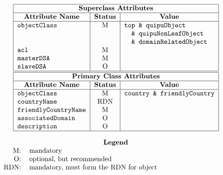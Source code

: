 
\smaller

\[\begin{tabular}{|l|c|l|}
\hline
\multicolumn{3}{|c|}{\bf Superclass Attributes}\\
\hline
\multicolumn{1}{|c|}{\bf Attribute Name}&
			\multicolumn{1}{c|}{\bf Status}&
				\multicolumn{1}{c|}{\bf Value}\\
\hline
\verb"objectClass"&	M&	\verb"top & quipuObject"\\
&			&	\verb"  & quipuNonLeafObject"\\
&			&	\verb"  & domainRelatedObject"\\
\verb"acl"&		M&	\\
\verb"masterDSA"&	M&	\\
\verb"slaveDSA"&	O&	\\
\hline
\hline
\multicolumn{3}{|c|}{\bf Primary Class Attributes}\\
\hline
\multicolumn{1}{|c|}{\bf Attribute Name}&
			\multicolumn{1}{c|}{\bf Status}&
				\multicolumn{1}{c|}{\bf Value}\\
\hline
\verb"objectClass"&	M&	\verb"country & friendlyCountry"\\
\verb"countryName"&	RDN&	\\
\verb"friendlyCountryName"&
			M&	\\
\verb"associatedDomain"&
			O&	\\
\verb"description"&	O&	\\
\hline
\end{tabular}\]

\[\begin{tabular}{rp{4in}}
\multicolumn{2}{c}{\bf Legend}\\
M:&	mandatory\\
O:&	optional, but recommended\\
RDN:&	mandatory, must form the RDN for object
\end{tabular}\]
